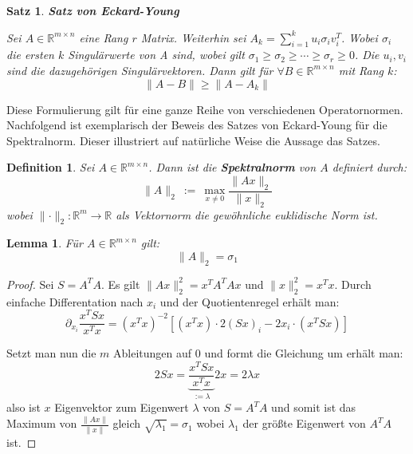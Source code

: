 \documentclass{article}
\newcommand{\R}[0]{\mathbb{R}}
\newtheorem{defin}{Definition}
\newtheorem{lemma}{Lemma}
\newtheorem{thm}{Satz}
\begin{document}
\begin{thm} \textbf{Satz von Eckard-Young}
    
    Sei $A \in \R^{m\times n}$ eine Rang $r$ Matrix. Weiterhin sei $A_k = \sum\limits_{i=1}^k u_i\sigma_iv_i^T$. 
    Wobei $\sigma_i$ die ersten $k$ Singulärwerte von A sind, wobei gilt $\sigma_1 \geq \sigma_2 \geq \cdots \geq \sigma_r \geq 0$. Die $u_i, v_i$ sind die dazugehörigen Singulärvektoren. 
    Dann gilt für $\forall B \in \R^{m \times n}$ mit Rang $k$:
    \begin{equation}
        \lVert A - B \rVert \geq \lVert A - A_k \rVert
    \end{equation}
\end{thm}

Diese Formulierung gilt für eine ganze Reihe von verschiedenen Operatornormen.
Nachfolgend ist exemplarisch der Beweis des Satzes von Eckard-Young für die Spektralnorm.
Dieser illustriert auf natürliche Weise die Aussage das Satzes.

\begin{defin}
    Sei $A \in \R^{m \times n}$. Dann ist die \textbf{Spektralnorm} von $A$ definiert durch:
    \begin{equation}
        \lVert A \rVert_2 \: := \: \max\limits_{x \neq 0} \frac{\lVert Ax \rVert_2}{\lVert x \rVert_2}
    \end{equation}
    wobei $\lVert \cdot \rVert_2: \R^m \to \R$ als Vektornorm die gewöhnliche euklidische Norm ist.
\end{defin}

\begin{lemma}
    Für $A \in \R^{m \times n}$ gilt:
    \begin{equation}
        \lVert A \rVert_2 = \sigma_1
    \end{equation}
\end{lemma}

\begin{proof}
    Sei $S = A^TA$. Es gilt $\lVert Ax \rVert_2^2 = x^TA^TAx$ und $\lVert x \rVert_2^2 = x^Tx$.
    Durch einfache Differentation nach $x_i$ und der Quotientenregel erhält man:
    \begin{equation}
        \partial_{x_i}\frac{x^TSx}{x^Tx} = (x^Tx)^{-2}\left[ (x^Tx) \cdot 2(Sx)_i - 2x_i \cdot (x^TSx) \right]
    \end{equation}

    Setzt man nun die $m$ Ableitungen auf $0$ und formt die Gleichung um erhält man:
    \begin{equation}
        2Sx = \underbrace{\frac{x^TSx}{x^Tx}}_{:= \lambda} 2x = 2\lambda x
    \end{equation}
    also ist $x$ Eigenvektor zum Eigenwert $\lambda$ von $S = A^TA$ und
    somit ist das Maximum von $\frac{\lVert Ax \rVert}{\lVert x \rVert}$ gleich $\sqrt{\lambda_1} = \sigma_1$ wobei $\lambda_1$ der größte Eigenwert von $A^TA$ ist.
\end{proof}
\end{document}
